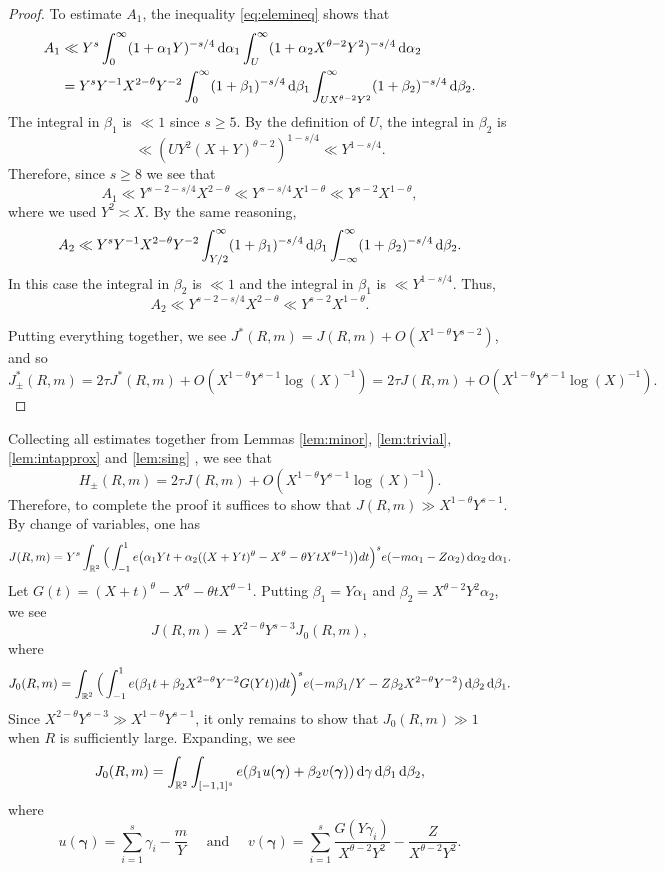 \documentclass[11pt,reqno]{amsart}
\numberwithin{equation}{section}
\renewcommand{\d}{\,{\rm d}}
\begin{document}
\begin{proof}
To estimate $A_1$, the inequality \eqref{eq:elemineq} shows that 
\begin{align*} A_1 & \ll Y^s\int_{0}^{\infty} (1+\alpha_1Y)^{-s/4} \d\alpha_1 \int_{U}^{\infty} (1+\alpha_2X^{\theta-2}Y^2)^{-s/4}\d\alpha_2 \\ 
& = Y^sY^{-1}X^{2-\theta}Y^{-2}\int_{0}^{\infty}(1+\beta_1)^{-s/4}\d\beta_1 \int_{UX^{{\theta-2}}Y^{2}}^{\infty} (1+\beta_2)^{-s/4}\d\beta_2. 
\end{align*}
The integral in $\beta_1$ is $\ll 1$ since $s \geq 5$. By the definition of $U$, the integral in $\beta_2$ is 
\[ \ll (UY^2(X+Y)^{\theta-2})^{1-s/4} \ll Y^{1-s/4}. \]
Therefore, since $s \geq 8$ we see that 
\[ A_1 \ll Y^{s-2-s/4}X^{2-\theta} \ll Y^{s-s/4}X^{1-\theta} \ll Y^{s-2}X^{1-\theta}, \]
where we used $Y^2 \asymp X$.  
By the same reasoning, 
\[ A_2 \ll Y^{s}Y^{-1}X^{2-\theta}Y^{-2} \int_{Y/2}^{\infty} (1+\beta_1)^{-s/4}\d\beta_1 \int_{-\infty}^{\infty}(1+\beta_2)^{-s/4}\d\beta_2. \]
In this case the integral in $\beta_2$ is $\ll 1$ and the integral in $\beta_1$ is $\ll Y^{1-s/4}$. Thus, 
\[ A_2 \ll Y^{s-2-s/4}X^{2-\theta} \ll Y^{s-2}X^{1-\theta}. \]


Putting everything together, we see $J^*(R,m) = J(R,m)+O(X^{1-\theta}Y^{s-2}) $, and so 
\[ J^*_{\pm}(R,m) = 2\tau J^*(R,m)+O(X^{1-\theta}Y^{s-1}\log(X)^{-1}) = 2\tau J(R,m)+O(X^{1-\theta}Y^{s-1}\log(X)^{-1}). \]
\end{proof}

Collecting all estimates together from Lemmas \ref{lem:minor}, \ref{lem:trivial}, \ref{lem:intapprox} and \ref{lem:sing} , we see that 
\[ H_{\pm}(R,m) = 2\tau J(R,m) + O(X^{1-\theta}Y^{s-1}\log(X)^{-1}). \]
Therefore, to complete the proof it suffices to show that  $J(R,m) \gg X^{1-\theta}Y^{s-1}$.
By change of variables, one has 
\[ J(R,m) = Y^s \int_{\mathbb{R}^2} \Big( \int_{-1}^1 e\big(\alpha_1Yt +\alpha_2((X+Yt)^{\theta}-X^{\theta}-\theta YtX^{\theta-1})\big)dt\Big)^se(-m\alpha_1-Z\alpha_2)\d\alpha_2\d\alpha_1.  \]
Let $G(t) = (X+t)^{\theta}-X^{\theta}-\theta tX^{\theta-1}$. Putting $\beta_1 = Y\alpha_1$ and $\beta_2 = X^{\theta-2}Y^2\alpha_2$, we see 
\[ J(R,m) = X^{2-\theta}Y^{s-3}J_0(R,m), \]
where 
\[ J_0(R,m) = \int_{\mathbb{R}^2} \Big( \int_{-1}^1 e(\beta_1t+\beta_2X^{2-\theta}Y^{-2}G(Yt))dt \Big)^s e(-m\beta_1/Y-Z\beta_2X^{2-\theta}Y^{-2})\d\beta_2\d\beta_1. \]
Since $X^{2-\theta}Y^{s-3} \gg X^{1-\theta}Y^{s-1}$, it only remains to show that $J_0(R,m) \gg 1$ when $R$ is sufficiently large. Expanding, we see 
\[ J_0(R,m) = \int_{\mathbb{R}^2} \int_{[-1,1]^s} e(\beta_1u(\boldsymbol{\gamma})+\beta_2v(\boldsymbol{\gamma}))\d\mathbf{\gamma} \d\beta_1\d\beta_2, \]
where 
\[ u(\boldsymbol{\gamma}) = \sum_{i=1}^s \gamma_i-\frac{m}{Y} \quad \text{ and } \quad v(\boldsymbol{\gamma}) = \sum_{i=1}^s \frac{G(Y\gamma_i)}{X^{\theta-2}Y^2}-\frac{Z}{X^{\theta-2}Y^2}. \]
\end{document}

